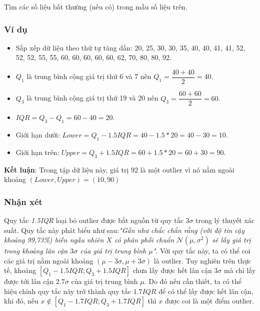 \begin{footnotesize}
\begin{frame}
\begin{center}
        \end{center}
        Tìm các số liệu bất thường (nếu có) trong mẫu số liệu trên.
\end{frame}
\begin{frame}
\frametitle{Ví dụ}
\begin{itemize}
	\item Sắp xếp dữ liệu theo thứ tự tăng dần: 20, 25, 30, 30, 35, 40, 40, 41, 41, 52, 52, 52, 55, 55,  60, 60, 60, 60, 60, 62, 70, 80, 80, 92.
    \item $Q_1$ là trung bình cộng giá trị thứ 6 và 7 nên $Q_1 = \dfrac{40 + 40}{2} = 40$.
    \item $Q_3$ là trung bình cộng giá trị thứ 19 và 20 nên $Q_3 = \dfrac{60 + 60}{2} = 60$.
    \item $IQR = Q_3 - Q_1 = 60 - 40 = 20$.
    \item Giới hạn dưới: $Lower = Q_1 - 1.5IQR = 40 - 1.5*20 = 40 - 30 = 10$.
    \item Giới hạn trên: $Upper = Q_3 + 1.5IQR = 60 + 1.5*20 = 60 + 30 =  90$.
\end{itemize}
\textbf{Kết luận}: Trong tập dữ liệu này, giá trị 92 là một outlier vì nó nằm ngoài khoảng $(Lower, Upper) = (10,90)$
\end{frame}
\begin{frame}
\frametitle{Nhận xét}
Quy tắc \textit{1.5IQR} loại bỏ outlier được bắt nguồn từ quy tắc $3 \sigma$ trong lý thuyết xác suất. Quy tắc này phát biểu như sau:\textit{"Gần như chắc chắn rằng (với độ tin cậy khoảng 99,73\%) biến ngẫu nhiên $X$ có phân phối chuẩn} $\mathcal{N}(\mu, \sigma^2)$ \textit{sẽ lấy giá trị trong khoảng lân cận $3 \sigma$ của giá trị trung bình $\mu$"}. 
Với quy tắc này, ta có thể coi các giá trị nằm ngoài khoảng $(\mu - 3\sigma, \mu+3\sigma)$ là outlier. Tuy nghiên trên thực tế, khoảng $\left[Q_1-1.5IQR;Q_3+1.5IQR\right]$ chưa lấy được hết lân cận $3 \sigma$ mà chỉ lấy được tới lân cận $2.7 \sigma$ của giá trị trung bình $\mu$.
Do đó nếu cần thiết, ta có thể hiệu chỉnh quy tắc này trở thành quy tắc $1.7IQR$ để có thể lấy được hết lân cận, khi đó, nếu $x \notin \left[Q_1-1.7IQR; Q_3+1.7IQR\right]$ thì $x$ được coi là một điểm outlier.
\end{frame}

\end{footnotesize}
